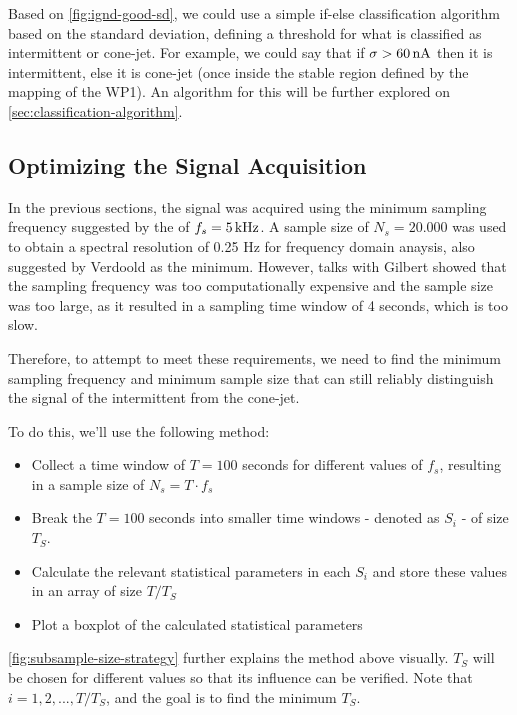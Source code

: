 \documentclass[oneside,12pt]{article}
\begin{document}
Based on \autoref{fig:ignd-good-sd}, we could use a simple if-else classification algorithm based on the standard deviation, 
defining a threshold for what is classified as intermittent or cone-jet. For example, we could say that if $\sigma > 60 \,\mathrm{nA}$
then it is intermittent, else it is cone-jet (once inside the stable region defined by the mapping of the WP1).
An algorithm for this will be further explored on \autoref{sec:classification-algorithm}.


\subsection{Optimizing the Signal Acquisition}

In the previous sections, the signal was acquired using the minimum sampling frequency
suggested by the \cite{Verdoold2013} of $f_s = 5 \,\mathrm{kHz}$. A sample size of $N_s = 20.000$ was used to obtain a spectral resolution of 0.25 Hz
for frequency domain anaysis, also suggested by Verdoold as the minimum. However, talks with Gilbert showed that the sampling frequency was too
computationally expensive and the sample size was too large, as it resulted in a sampling time window of 4 seconds, which is too slow.

Therefore, to attempt to meet these requirements, we need to find the minimum sampling frequency and
minimum sample size that can still reliably distinguish the signal of the intermittent from the cone-jet.

To do this, we'll use the following method:

\begin{itemize}
    \item Collect a time window of $T = 100$ seconds for different values of $f_s$, resulting in a sample size of $N_s = T \cdot f_s$
    \item Break the $T = 100$ seconds into smaller time windows - denoted as $S_i$ - of size $T_S$. 
    \item Calculate the relevant statistical parameters in each $S_i$ and store these values in an array of size $T / T_S$
    \item Plot a boxplot of the calculated statistical parameters
\end{itemize}

\autoref{fig:subsample-size-strategy} further explains the method above visually. $T_S$ will be chosen for different values so that its influence
can be verified. Note that $i = 1, 2, ..., T / T_S$, and the goal is to find the minimum $T_S$.
\end{document}
